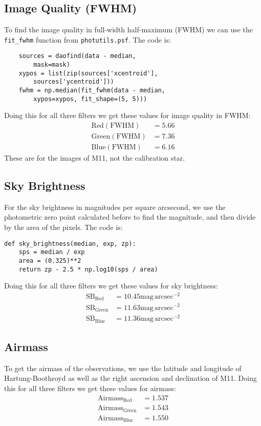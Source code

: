 \documentclass[twocolumn]{article}
\begin{document}
\subsection{Image Quality (FWHM)}
To find the image quality in full-width half-maximum (FWHM) we can use the \verb|fit_fwhm| function from \verb|photutils.psf|. The code is:
\begin{verbatim}
    sources = daofind(data - median, 
        mask=mask)
    xypos = list(zip(sources['xcentroid'], 
        sources['ycentroid']))
    fwhm = np.median(fit_fwhm(data - median, 
        xypos=xypos, fit_shape=(5, 5)))
\end{verbatim}
Doing this for all three filters we get these values for image quality in FWHM: 
\[
\begin{aligned}
\mathrm{Red (FWHM)} &= 5.66 \\
\mathrm{Green (FWHM)} &= 7.36 \\
\mathrm{Blue (FWHM)} &= 6.16
\end{aligned}
\]
These are for the images of M11, not the calibration star.
\subsection{Sky Brightness}
For the sky brightness in magnitudes per square arcsecond, we use the photometric zero point calculated before to find the magnitude, and then divide by the area of the pixels. The code is:
\begin{verbatim}
def sky_brightness(median, exp, zp):
    sps = median / exp
    area = (0.325)**2  
    return zp - 2.5 * np.log10(sps / area)
\end{verbatim}
Doing this for all three filters we get these values for sky brightness: 
\[
\begin{aligned}
\mathrm{SB_{Red}} &= 10.45 \mathrm{mag}\,\mathrm{arcsec}^{-2} \\
\mathrm{SB_{Green}} &= 11.63 \mathrm{mag}\,\mathrm{arcsec}^{-2}\\
\mathrm{SB_{Blue}} &= 11.36 \mathrm{mag}\,\mathrm{arcsec}^{-2}
\end{aligned}
\]
\subsection{Airmass}
To get the airmass of the observations, we use the latitude and longitude of Hartung-Boothroyd as well as the right ascension and declination of M11. Doing this for all three filters we get these values for airmass:
\[
\begin{aligned}
\mathrm{Airmass_{Red}} &= 1.537 \\
\mathrm{Airmass_{Green}} &= 1.543\\
\mathrm{Airmass_{Blue}} &= 1.550
\end{aligned}
\]
\end{document}
